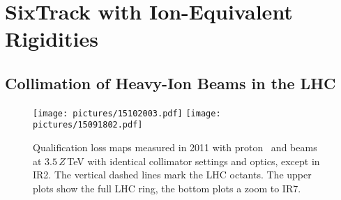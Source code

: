 \chapter{SixTrack with Ion-Equivalent Rigidities }\label{chap:stier}
%
%
%


\section{Collimation of Heavy-Ion Beams in the LHC}

\begin{figure}[htbp]
  \begin{center}
\texttt{[image: pictures/15102003.pdf]}
\texttt{[image: pictures/15091802.pdf]}
\caption{Qualification loss maps measured in 2011 with proton~\cite{Bruce2014a} and \lead beams~\cite{} at $3.5\,Z\,$TeV with identical collimator settings and optics, except in IR2. The vertical dashed lines mark the LHC octants. The upper plots show the full LHC ring, the bottom plots a zoom to IR7.}
\label{fig:meas_lm_comparison}
  \end{center}
\end{figure}


